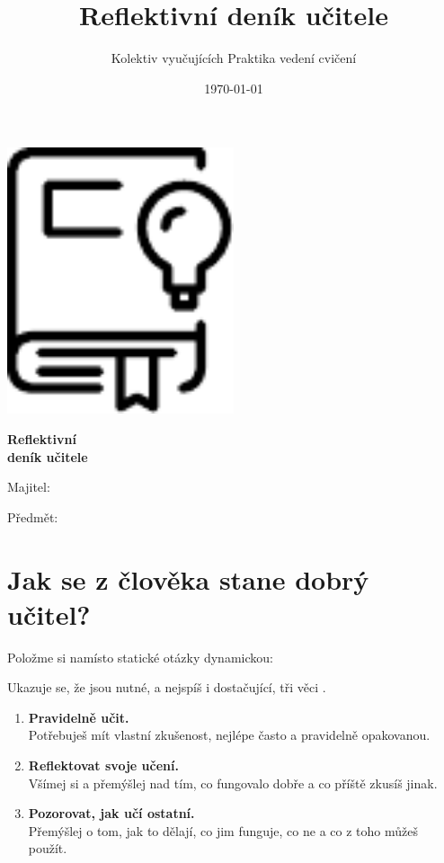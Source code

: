 \documentclass[twoside,openany]{book}
\title{Reflektivní deník učitele}
\author{Kolektiv vyučujících Praktika vedení cvičení}
\date{\today}
\newlength{\spc} %
\newcommand{\punct}[1]{%
  \settowidth{\spc}{#1}%
  \addtolength{\spc}{-1.8\spc}%
  #1%
  \hspace*{\spc}%
}
\begin{document}
\begin{titlepage}
	\centering
    \vspace*{1cm}
	\includegraphics[width=0.5\textwidth]{img/diary}\par
	\vspace{0.5cm}
	{\huge\bfseries Reflektivní\\ deník učitele\par}
	\vfill
	\raggedright
    \Large
	Majitel:\par
    \vspace{0.2cm}
    Předmět:\par
\end{titlepage}


\chapter*{Jak se z člověka stane dobrý učitel?}

\vspace*{1em}
Položme si namísto statické otázky dynamickou:

\vspace*{1em}
\textit{\large {}}

\vspace*{1em}
Ukazuje se, že jsou nutné, a nejspíš i dostačující, tři věci\punct{.}\footnotemark
{}
\begin{enumerate}
\item \textbf{Pravidelně učit.} \\Potřebuješ mít vlastní zkušenost, nejlépe často a pravidelně opakovanou.
\item \textbf{Reflektovat svoje učení.} \\Všímej si a přemýšlej nad tím, co fungovalo dobře a co příště zkusíš jinak.
\item \textbf{Pozorovat, jak učí ostatní.} \\Přemýšlej o tom, jak to dělají, co jim funguje, co ne a co z toho můžeš použít.
\end{enumerate}
\end{document}
